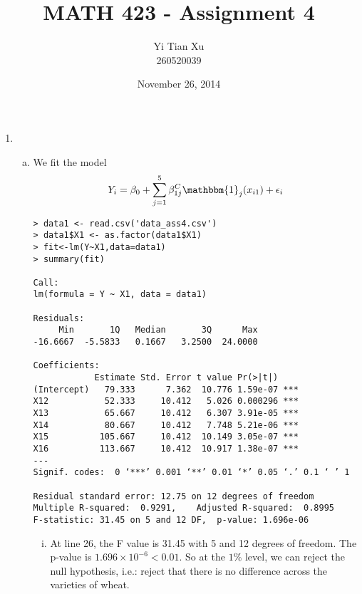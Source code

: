 \documentclass[10pt]{article}
\title{MATH 423 - Assignment 4}
\author{Yi Tian Xu\\260520039}
\date{November 26, 2014}
\begin{document}
\maketitle

\begin{enumerate}
	\item \begin{enumerate}[(a)]
		\item We fit the model 
		\begin{displaymath}
			Y_i = \beta_0 + \sum_{j=1}^5 \beta_{1j}^C \mathbbm{1}_j(x_{i1}) +\epsilon_i
		\end{displaymath}
\begin{lstlisting}
> data1 <- read.csv('data_ass4.csv')
> data1$X1 <- as.factor(data1$X1)
> fit<-lm(Y~X1,data=data1)
> summary(fit)

Call:
lm(formula = Y ~ X1, data = data1)

Residuals:
     Min       1Q   Median       3Q      Max 
-16.6667  -5.5833   0.1667   3.2500  24.0000 

Coefficients:
            Estimate Std. Error t value Pr(>|t|)    
(Intercept)   79.333      7.362  10.776 1.59e-07 ***
X12           52.333     10.412   5.026 0.000296 ***
X13           65.667     10.412   6.307 3.91e-05 ***
X14           80.667     10.412   7.748 5.21e-06 ***
X15          105.667     10.412  10.149 3.05e-07 ***
X16          113.667     10.412  10.917 1.38e-07 ***
---
Signif. codes:  0 ‘***’ 0.001 ‘**’ 0.01 ‘*’ 0.05 ‘.’ 0.1 ‘ ’ 1

Residual standard error: 12.75 on 12 degrees of freedom
Multiple R-squared:  0.9291,    Adjusted R-squared:  0.8995 
F-statistic: 31.45 on 5 and 12 DF,  p-value: 1.696e-06
		\end{lstlisting}
		\begin{enumerate}[(i)]
			\item At line 26, the F value is 31.45 with 5 and 12 degrees of freedom. The p-value is $1.696\times 10^{-6} < 0.01$. So at the $1\%$ level, we can reject the null hypothesis, i.e.: reject that there is no difference across the varieties of wheat.
			

\end{enumerate}
\end{enumerate}
\end{enumerate}
\end{document}
